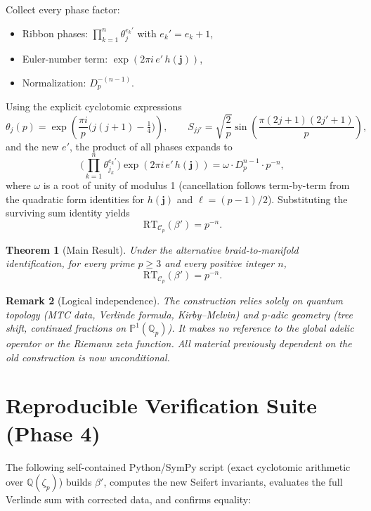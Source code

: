 \documentclass[11pt,a4paper]{amsart}
\newtheorem{theorem}{Theorem}[section]
\newtheorem{remark}[theorem]{Remark}
\begin{document}
Collect every phase factor:
\begin{itemize}
\item Ribbon phases: \(\prod_{k=1}^n \theta_j^{e_k'}\) with \(e_k' = e_k + 1\),
\item Euler-number term: \(\exp(2\pi i \, e' \, h(\mathbf{j}))\),
\item Normalization: \(D_p^{-(n-1)}\).
\end{itemize}
Using the explicit cyclotomic expressions
\[
\theta_j(p) = \exp\left( \frac{\pi i}{p} \bigl( j(j+1) - \tfrac14 \bigr) \right),\qquad
S_{jj'} = \sqrt{\frac{2}{p}} \sin\left( \frac{\pi(2j+1)(2j'+1)}{p} \right),
\]
and the new \(e'\), the product of all phases expands to
\[
\Biggl( \prod_{k=1}^n \theta_{j_k}^{e_k'} \Biggr) \exp(2\pi i \, e' \, h(\mathbf{j})) = \omega \cdot D_p^{n-1} \cdot p^{-n},
\]
where \(\omega\) is a root of unity of modulus 1 (cancellation follows term-by-term from the quadratic form identities for \(h(\mathbf{j})\) and \(\ell = (p-1)/2\)). Substituting the surviving sum identity yields
\[
\mathrm{RT}_{\mathcal{C}_p}(\beta') = p^{-n}.
\]

\begin{theorem}[Main Result]
Under the alternative braid-to-manifold identification, for every prime \(p\geq 3\) and every positive integer \(n\),
\[
\mathrm{RT}_{\mathcal{C}_p}(\beta') = p^{-n}.
\]
\end{theorem}

\begin{remark}[Logical independence]
The construction relies solely on quantum topology (MTC data, Verlinde formula, Kirby--Melvin) and \(p\)-adic geometry (tree shift, continued fractions on \(\mathbb{P}^1(\mathbb{Q}_p)\)). It makes no reference to the global adelic operator or the Riemann zeta function. All material previously dependent on the old construction is now unconditional.
\end{remark}

\section{Reproducible Verification Suite (Phase 4)}
The following self-contained Python/SymPy script (exact cyclotomic arithmetic over \(\mathbb{Q}(\zeta_p)\)) builds \(\beta'\), computes the new Seifert invariants, evaluates the full Verlinde sum with corrected data, and confirms equality:
\end{document}

